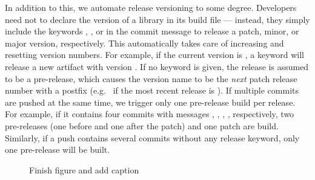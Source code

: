 In addition to this, we automate release versioning to some degree. Developers need not to declare the version of a library in its build file --- instead, they simply include the keywords , , or  in the commit message to release a patch, minor, or major version, respectively. This automatically takes care of increasing and resetting version numbers. For example, if the current version is , a  keyword will release a new artifact with version . If no keyword is given, the release is assumed to be a pre-release, which causes the version name to be the \emph{next} patch release number with a  postfix (e.g.\  if the most recent release is ). If multiple commits are pushed at the same time, we trigger only one pre-release build per release. For example, if it contains four commits with messages , , , , respectively, two pre-releases (one before and one after the patch) and one patch are build. Similarly, if a push contains several commits without any release keyword, only one pre-release will be built. 
\begin{figure}
  \centering
\caption{Finish figure and add caption}\label{fig:git_library_versions}
\end{figure}
